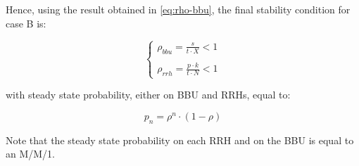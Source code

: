 \documentclass[11pt,a4paper,oneside, openright]{article}
\begin{document}
Hence, using the result obtained in \eqref{eq:rho-bbu}, the final stability condition for case B is:

$$ \begin{cases} \rho_{bbu} = \frac{s}{t \cdot X} < 1 \\ \\ \rho_{rrh} = \frac{p \cdot k}{t \cdot N} < 1 \end{cases} $$

with steady state probability, either on BBU and RRHs, equal to:

$$ p_{n} = \rho^n \cdot (1 - \rho) $$

Note that the steady state probability on each RRH and on the BBU is equal to an M/M/1.
\end{document}
